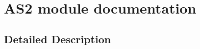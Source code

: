 \hypertarget{group___a_s2__module}{}\section{A\+S2 module documentation}
\label{group___a_s2__module}


\subsection{Detailed Description}
